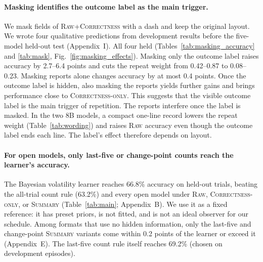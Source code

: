 \documentclass[letterpaper]{article} %
\newcommand{\Raw}{\textsc{Raw}}
\newcommand{\RawCorrectness}{\textsc{Raw+Correctness}}
\newcommand{\CorrectnessOnly}{\textsc{Correctness-only}}
\newcommand{\Summary}{\textsc{Summary}}
\begin{document}
\paragraph{Masking identifies the outcome label as the main trigger.} We mask fields of \RawCorrectness{} with a dash and keep the original layout. We wrote four qualitative predictions from development results before the five-model held-out test (Appendix~I). All four held (Tables~\ref{tab:masking_accuracy} and \ref{tab:mask}, Fig.~\ref{fig:masking_effects}). Masking only the outcome label raises accuracy by 2.7--6.4 points and cuts the repeat weight from 0.42--0.87 to 0.08--0.23. Masking reports alone changes accuracy by at most 0.4 points. Once the outcome label is hidden, also masking the reports yields further gains and brings performance close to \CorrectnessOnly{}. This suggests that the visible outcome label is the main trigger of repetition. The reports interfere once the label is masked. In the two 8B models, a compact one-line record lowers the repeat weight (Table~\ref{tab:wording}) and raises \Raw{} accuracy even though the outcome label ends each line. The label's effect therefore depends on layout.

\paragraph{For open models, only last-five or change-point counts reach the learner's accuracy.} The Bayesian volatility learner reaches 66.8\% accuracy on held-out trials, beating the all-trial count rule (63.2\%) and every open model under \Raw{}, \CorrectnessOnly{}, or \Summary{} (Table~\ref{tab:main}; Appendix~B). We use it as a fixed reference: it has preset priors, is not fitted, and is not an ideal observer for our schedule. Among formats that use no hidden information, only the last-five and change-point \Summary{} variants come within 0.2 points of the learner or exceed it (Appendix~E). The last-five count rule itself reaches 69.2\% (chosen on development episodes).
\end{document}
